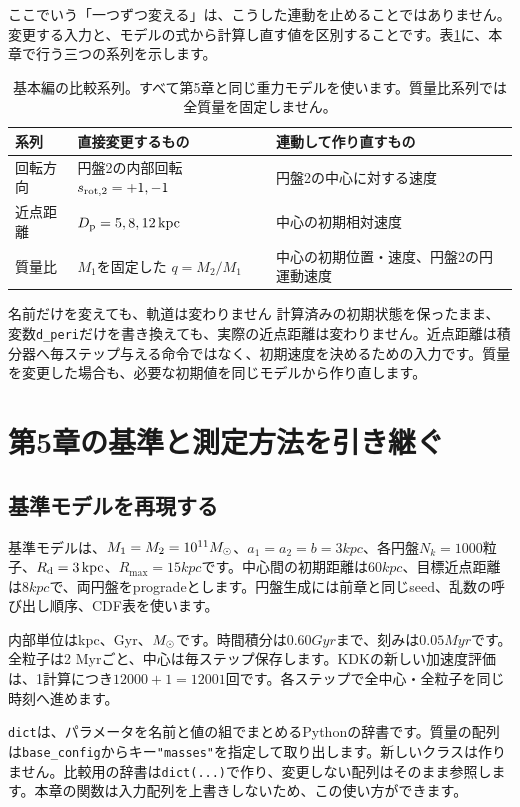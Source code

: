 ここでいう「一つずつ変える」は、こうした連動を止めることではありません。変更する入力と、モデルの式から計算し直す値を区別することです。表\ref{tab:ch6-design}に、本章で行う三つの系列を示します。
\begin{table}[htbp]\centering\small
\caption{基本編の比較系列。すべて第5章と同じ重力モデルを使います。質量比系列では全質量を固定しません。}\label{tab:ch6-design}
\begin{tabularx}{\linewidth}{lXX}\toprule
系列 & 直接変更するもの & 連動して作り直すもの \\\midrule
回転方向 & 円盤2の内部回転 $s_{{\rm rot},2}=+1,-1$ & 円盤2の中心に対する速度 \\
近点距離 & $D_{\rm p}=5,8,12\,\mathrm{kpc}$ & 中心の初期相対速度 \\
質量比 & $M_1$を固定した $q=M_2/M_1$ & 中心の初期位置・速度、円盤2の円運動速度 \\\bottomrule
\end{tabularx}
\end{table}

\begin{failbox}{名前だけを変えても、軌道は変わりません}
計算済みの初期状態を保ったまま、変数\texttt{d\_peri}だけを書き換えても、実際の近点距離は変わりません。近点距離は積分器へ毎ステップ与える命令ではなく、初期速度を決めるための入力です。質量を変更した場合も、必要な初期値を同じモデルから作り直します。
\end{failbox}

\section{第5章の基準と測定方法を引き継ぐ}
\label{sec:ch6-baseline}
\subsection{基準モデルを再現する}
基準モデルは、$M_1=M_2=10^{11}M_\odot$、$a_1=a_2=b=3\unit{kpc}$、各円盤$N_k=1000$粒子、$R_{\rm d}=3\,\mathrm{kpc}$、$R_{\max}=15\unit{kpc}$です。中心間の初期距離は$60\unit{kpc}$、目標近点距離は$8\unit{kpc}$で、両円盤をprogradeとします。円盤生成には前章と同じseed、乱数の呼び出し順序、CDF表を使います。

内部単位はkpc、Gyr、$M_\odot$です。時間積分は$0.60\unit{Gyr}$まで、刻みは$0.05\unit{Myr}$です。全粒子は2 Myrごと、中心は毎ステップ保存します。KDKの新しい加速度評価は、1計算につき$12000+1=12001$回です。各ステップで全中心・全粒子を同じ時刻へ進めます。

\texttt{dict}は、パラメータを名前と値の組でまとめるPythonの辞書です。質量の配列は\texttt{base\_config}からキー\texttt{"masses"}を指定して取り出します。新しいクラスは作りません。比較用の辞書は\texttt{dict(...)}で作り、変更しない配列はそのまま参照します。本章の関数は入力配列を上書きしないため、この使い方ができます。


